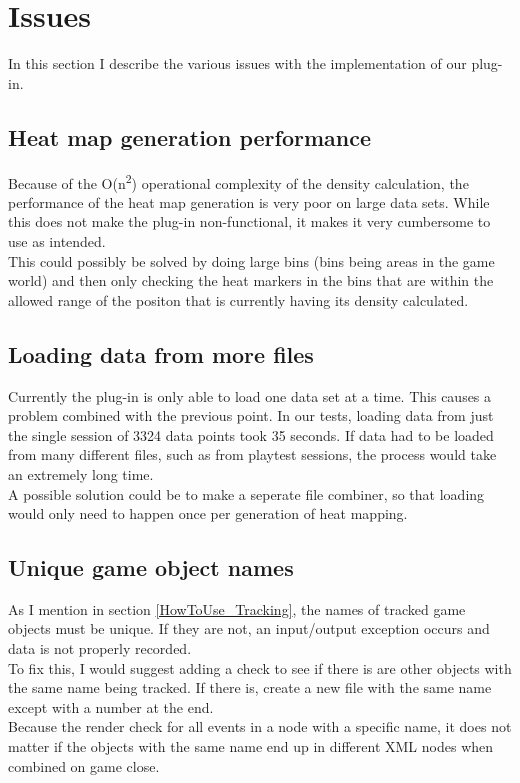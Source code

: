 \section{Issues}
\label{Issues}
In this section I describe the various issues with the implementation of our plug-in.
\subsection{Heat map generation performance}
\label{Issues_generationPerformance}
Because of the O(n\textsuperscript{2}) operational complexity of the density calculation, the performance of the heat map generation is very poor on large data sets. While this does not make the plug-in non-functional, it makes it very cumbersome to use as intended. 
\\This could possibly be solved by doing large bins (bins being areas in the game world) and then only checking the heat markers in the bins that are within the allowed range of the positon that is currently having its density calculated.

\subsection{Loading data from more files}
\label{Issues_MoreFiles}
Currently the plug-in is only able to load one data set at a time. This causes a problem combined with the previous point. In our tests, loading data from just the single session of 3324 data points took 35 seconds. If data had to be loaded from many different files, such as from playtest sessions, the process would take an extremely long time. 
\\A possible solution could be to make a seperate file combiner, so that loading would only need to happen once per generation of heat mapping.

\subsection{Unique game object names}
\label{Issues_UniqueNames}
As I mention in section \ref{HowToUse_Tracking}, the names of tracked game objects must be unique. If they are not, an input/output exception occurs and data is not properly recorded. 
\\To fix this, I would suggest adding a check to see if there is are other objects with the same name being tracked. If there is, create a new file with the same name except with a number at the end. 
\\Because the render check for all events in a node with a specific name, it does not matter if the objects with the same name end up in different XML nodes when combined on game close.

